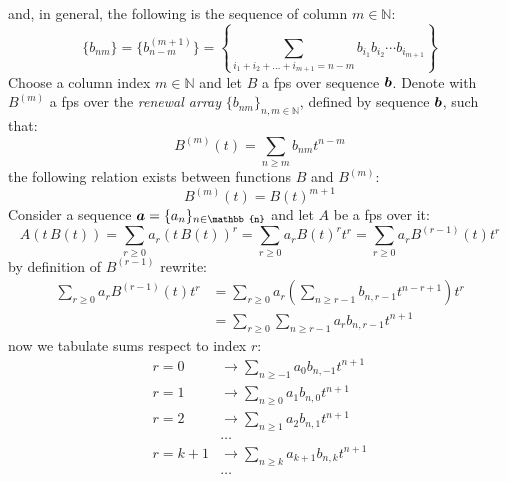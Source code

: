 and, in general, the following is the sequence of column $m\in\mathbb{N}$:
\begin{displaymath}
    \lbrace b_{nm}\rbrace
        =\lbrace b_{n-m}^{(m+1)}\rbrace
        =\left\lbrace \sum_{i_{1}+i_{2}+\ldots+i_{m+1} =n-m}
            {b_{i_{1}}b_{i_{2}}\cdots b_{i_{m+1}}}\right\rbrace
\end{displaymath}
Choose a column index $m\in\mathbb{N}$ and let $B$ a \ac{fps} over sequence $\boldsymbol{b}$.
Denote with $B^{(m)}$ a \ac{fps} over the \emph{renewal array} 
$\lbrace b_{nm} \rbrace_{n,m\in\mathbb{N}}$, defined by sequence $\boldsymbol{b}$, 
such that:
\begin{displaymath}
    B^{(m)}(t) = \sum_{n\geq m}{b_{nm}t^{n-m}}
\end{displaymath}
the following relation exists between functions $B$ and $B^{(m)}$:
\begin{displaymath}
    B^{(m)}(t) = B(t)^{m+1}
\end{displaymath}
Consider a sequence
$\vect{a}=\lbrace a_{n} \rbrace_{n\in\mathbb{n}}$ and let $A$ be
a \ac{fps} over it:
\begin{displaymath}
    A\left(t\,B(t)\right) 
        = \sum_{r\geq 0}{a_{r}\left(t\,B(t)\right)^{r}}
        = \sum_{r\geq 0}{a_{r}B(t)^{r}t^{r}}
        = \sum_{r\geq 0}{a_{r}B^{(r-1)}(t)t^{r}}
\end{displaymath}
by definition of $B^{(r-1)}$ rewrite:
\begin{displaymath}
    \begin{split}
        \sum_{r\geq 0}{a_{r}B^{(r-1)}(t)t^{r}}
            &=\sum_{r\geq 0}{a_{r}\left(\sum_{n\geq r-1}{b_{n,r-1}t^{n-r+1}}\right)t^{r}}\\
            &=\sum_{r\geq 0}{\sum_{n\geq r-1}{a_{r}b_{n,r-1}t^{n+1}}}
    \end{split}
\end{displaymath}
now we tabulate sums respect to index $r$:
\begin{displaymath}
    \begin{split}
        r=0 &\rightarrow \sum_{n\geq -1}{a_{0}b_{n,-1}t^{n+1}}\\
        r=1 &\rightarrow \sum_{n\geq 0}{a_{1}b_{n,0}t^{n+1}}\\
        r=2 &\rightarrow \sum_{n\geq 1}{a_{2}b_{n,1}t^{n+1}}\\
        &\ldots\\
        r=k+1 &\rightarrow \sum_{n\geq k}{a_{k+1}b_{n,k}t^{n+1}}\\
        &\ldots\\
    \end{split}
\end{displaymath}
